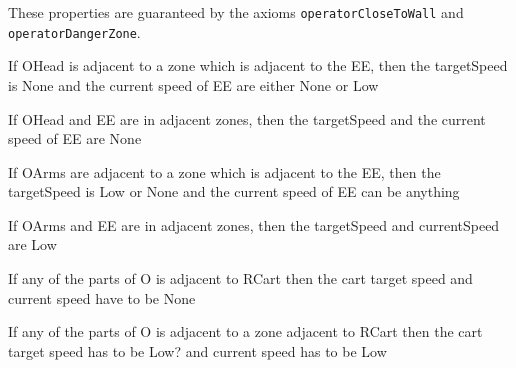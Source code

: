 These properties are guaranteed by the axioms \texttt{operatorCloseToWall} and \texttt{operatorDangerZone}.

If OHead is adjacent to a zone which is adjacent to the EE, then the targetSpeed is None and the current speed of EE are either None or Low

If OHead and EE are in adjacent zones, then the targetSpeed and the current speed of EE are None

If OArms are adjacent to a zone which is adjacent to the EE, then the targetSpeed is Low or None and the current speed of EE can be anything

If OArms and EE are in adjacent zones, then the targetSpeed and currentSpeed are Low

If any of the parts of O is adjacent to RCart then the cart target speed and current speed have to be None

If any of the parts of O is adjacent to a zone adjacent to RCart then the cart target speed has to be Low? and current speed has to be Low

